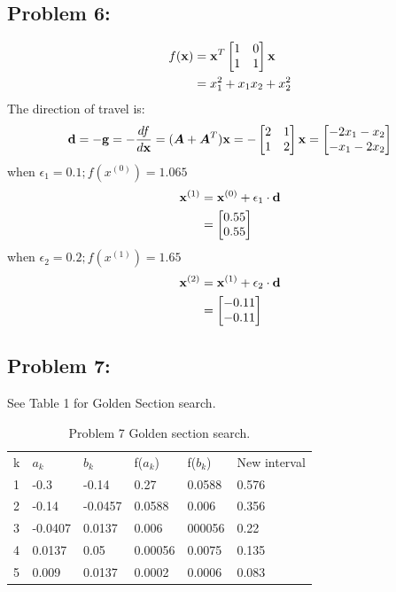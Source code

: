 \documentclass{article}
\begin{document}
\subsection*{Problem 6: } 
\begin{align*} 
f(\boldsymbol{\mathrm{x}}) & = \boldsymbol{\mathrm{x}}^T\begin{bmatrix} 1 & 0 \\ 1 & 1  \end{bmatrix} \boldsymbol{\mathrm{x}} \\
& = x_1^2 + x_1x_2 + x_2^2 \\
\end{align*} 
The direction of travel is:  \\
\begin{align*} 
\boldsymbol{\mathrm{d}} = -\boldsymbol{\mathrm{g}} = -\frac{df}{d\boldsymbol{\mathrm{x}}} = (\boldsymbol{A} + \boldsymbol{A}^T) \boldsymbol{\mathrm{x}} = -\begin{bmatrix} 2 & 1 \\ 1 & 2  \end{bmatrix} \boldsymbol{\mathrm{x}}  = \begin{bmatrix} -2x_1-x_2 \\ -x_1-2x_2 \end{bmatrix}\\
\end{align*} 
when $ \epsilon_1  = 0.1;  f(x^{(0)} )= 1.065 $ \\
\begin{align*} 
\boldsymbol{\mathrm{x}}^{(1)} &= \boldsymbol{\mathrm{x}}^{(0)} + \epsilon_1 \cdot \boldsymbol{\mathrm{d}}    \\
	& = \begin{bmatrix} 0.55 \\ 0.55 \end{bmatrix} 
\end{align*} 
when $ \epsilon_2  = 0.2 ; f(x^{(1)} )= 1.65    $\\
\begin{align*} 
\boldsymbol{\mathrm{x}}^{(2)} & = \boldsymbol{\mathrm{x}}^{(1)} + \epsilon_2 \cdot \boldsymbol{\mathrm{d}}    \\
	& = \begin{bmatrix} -0.11 \\ -0.11 \end{bmatrix} 
\end{align*} 

\subsection*{Problem 7: } 
See Table 1 for  Golden Section search. 
\begin{table}[]
\centering
\caption{Problem 7 Golden section search.}
\label{my-label}
\begin{tabular}{llllll}
k & $a_k$    & $b_k$    & f($a_k$) & f($b_k$) & New interval \\
1 & -0.3    & -0.14   & 0.27    & 0.0588  & 0.576      \\
2 & -0.14   & -0.0457 & 0.0588  & 0.006   & 0.356        \\
3 & -0.0407 & 0.0137  & 0.006   & 000056  & 0.22       \\
4 & 0.0137  & 0.05    & 0.00056 & 0.0075  & 0.135        \\
5 & 0.009   & 0.0137  & 0.0002  & 0.0006  & 0.083       
\end{tabular}
\end{table}
\end{document}
